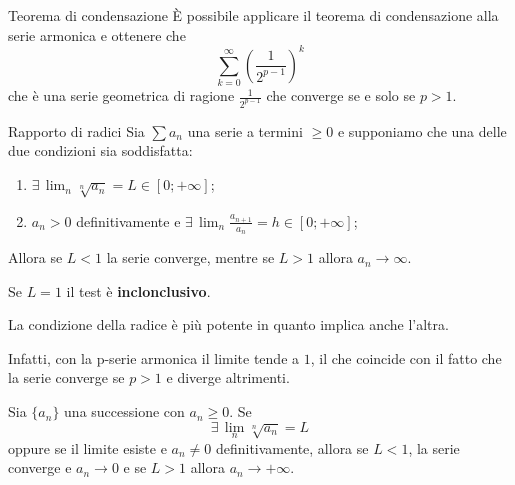 \documentclass[a4paper]{article}
\begin{document}
\begin{snippetexample}{Teorema di condensazione}
    È possibile applicare il teorema di condensazione alla serie armonica
    e ottenere che
    \[
        \sum_{k=0}^\infty {\left(\frac{1}{2^{p-1}}\right)}^k
    \]
    che è una serie geometrica di ragione
    \(\frac{1}{2^{p-1}}\) che converge se e solo se \(p>1\).
\end{snippetexample}

\begin{snippettheorem}{Rapporto di radici}
    Sia \(\sum a_n\) una serie a termini \(\geq 0\) e supponiamo che
    una delle due condizioni sia soddisfatta:
    \begin{enumerate}
        \item \(\exists\, \lim_n \sqrt[n]{a_n} = L \in [0; +\infty]\);
        \item \(a_n > 0\) definitivamente e
            \(\exists\, \lim_n \frac{a_{n+1}}{a_n} = h \in [0; +\infty]\);
    \end{enumerate}
    Allora se \(L < 1\) la serie converge, mentre se \(L > 1\) allora
    \(a_n \to \infty\).
\end{snippettheorem}

Se \(L=1\) il test è \textbf{inclonclusivo}.

La condizione della radice è più potente in quanto implica anche l'altra.

Infatti, con la p-serie armonica il limite tende a \(1\), il che coincide
con il fatto che la serie converge se \(p > 1\) e diverge altrimenti.

\begin{snippetcorollary}{}
    Sia \(\{a_n\}\) una successione con \(a_n \geq 0\).
    Se
    \[
        \exists\, \lim_n \sqrt[n]{a_n} = L
    \]
    oppure se il limite esiste e \(a_n \neq 0\) definitivamente,
    allora se \(L<1\), la serie converge e \(a_n \to 0\)
    e se \(L>1\) allora \(a_n \to +\infty\).
\end{snippetcorollary}
\end{document}
